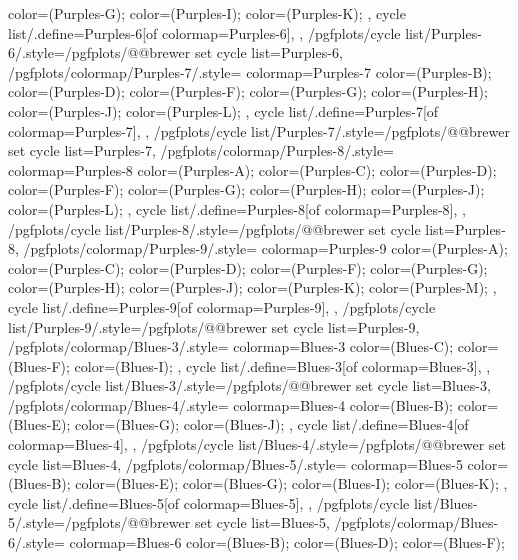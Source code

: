 {{{      color=(Purples-G);
      color=(Purples-I);
      color=(Purples-K);
    },
    cycle list/.define={Purples-6}{[of colormap=Purples-6]},
  },
  /pgfplots/cycle list/Purples-6/.style={/pgfplots/@@brewer set cycle list={Purples-6}},
  /pgfplots/colormap/Purples-7/.style={
    colormap={Purples-7}{
      color=(Purples-B);
      color=(Purples-D);
      color=(Purples-F);
      color=(Purples-G);
      color=(Purples-H);
      color=(Purples-J);
      color=(Purples-L);
    },
    cycle list/.define={Purples-7}{[of colormap=Purples-7]},
  },
  /pgfplots/cycle list/Purples-7/.style={/pgfplots/@@brewer set cycle list={Purples-7}},
  /pgfplots/colormap/Purples-8/.style={
    colormap={Purples-8}{
      color=(Purples-A);
      color=(Purples-C);
      color=(Purples-D);
      color=(Purples-F);
      color=(Purples-G);
      color=(Purples-H);
      color=(Purples-J);
      color=(Purples-L);
    },
    cycle list/.define={Purples-8}{[of colormap=Purples-8]},
  },
  /pgfplots/cycle list/Purples-8/.style={/pgfplots/@@brewer set cycle list={Purples-8}},
  /pgfplots/colormap/Purples-9/.style={
    colormap={Purples-9}{
      color=(Purples-A);
      color=(Purples-C);
      color=(Purples-D);
      color=(Purples-F);
      color=(Purples-G);
      color=(Purples-H);
      color=(Purples-J);
      color=(Purples-K);
      color=(Purples-M);
    },
    cycle list/.define={Purples-9}{[of colormap=Purples-9]},
  },
  /pgfplots/cycle list/Purples-9/.style={/pgfplots/@@brewer set cycle list={Purples-9}},
  /pgfplots/colormap/Blues-3/.style={
    colormap={Blues-3}{
      color=(Blues-C);
      color=(Blues-F);
      color=(Blues-I);
    },
    cycle list/.define={Blues-3}{[of colormap=Blues-3]},
  },
  /pgfplots/cycle list/Blues-3/.style={/pgfplots/@@brewer set cycle list={Blues-3}},
  /pgfplots/colormap/Blues-4/.style={
    colormap={Blues-4}{
      color=(Blues-B);
      color=(Blues-E);
      color=(Blues-G);
      color=(Blues-J);
    },
    cycle list/.define={Blues-4}{[of colormap=Blues-4]},
  },
  /pgfplots/cycle list/Blues-4/.style={/pgfplots/@@brewer set cycle list={Blues-4}},
  /pgfplots/colormap/Blues-5/.style={
    colormap={Blues-5}{
      color=(Blues-B);
      color=(Blues-E);
      color=(Blues-G);
      color=(Blues-I);
      color=(Blues-K);
    },
    cycle list/.define={Blues-5}{[of colormap=Blues-5]},
  },
  /pgfplots/cycle list/Blues-5/.style={/pgfplots/@@brewer set cycle list={Blues-5}},
  /pgfplots/colormap/Blues-6/.style={
    colormap={Blues-6}{
      color=(Blues-B);
      color=(Blues-D);
      color=(Blues-F);
}}}
